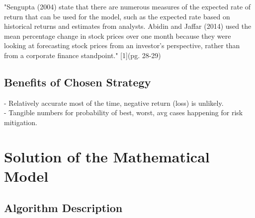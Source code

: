 \documentclass{article}
\begin{document}
\noindent{}
"Sengupta (2004) state that there are numerous measures of the expected rate of return that can be used for the model, such as the expected rate based on historical returns and estimates from analysts. Abidin and Jaffar (2014) used the mean percentage change in stock prices over one month because they were looking at forecasting stock prices from an investor’s perspective, rather than from a corporate finance standpoint." [1](pg. 28-29)

\subsection{Benefits of Chosen Strategy}
- Relatively accurate most of the time, negative return (loss) is unlikely.\\
- Tangible numbers for probability of best, worst, avg cases happening for risk mitigation.

\section{Solution of the Mathematical Model}

\subsection{Algorithm Description}
\end{document}
